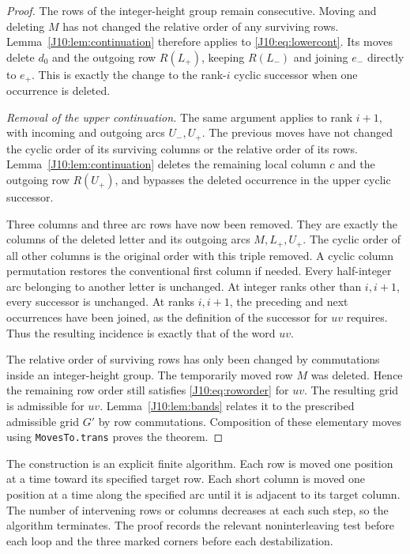 \documentclass[11pt,oneside]{report}
\theoremstyle{definition}
\numberwithin{equation}{section}
\newcommand{\decl}[1]{\textnormal{\nolinkurl{#1}}}
\begin{document}
\begin{proof}
The rows of the integer-height group remain consecutive.
Moving and deleting $M$ has not changed the relative order of any
surviving rows. Lemma~\ref{J10:lem:continuation} therefore applies to
\eqref{J10:eq:lowercont}. Its moves delete $d_0$ and the outgoing row
$R(L_+)$, keeping $R(L_-)$ and joining $e_-$ directly to $e_+$.
This is exactly the change to the rank-$i$ cyclic successor when one
occurrence is deleted.

\textit{Removal of the upper continuation.}
The same argument applies to rank $i+1$, with incoming and outgoing
arcs $U_-,U_+$. The previous moves have not changed the cyclic order
of its surviving columns or the relative order of its rows.
Lemma~\ref{J10:lem:continuation} deletes the remaining local column $c$
and the outgoing row $R(U_+)$, and bypasses the deleted occurrence
in the upper cyclic successor.

Three columns and three arc rows have now been removed. They are
exactly the columns of the deleted letter and its outgoing arcs
$M,L_+,U_+$. The cyclic order of all other columns is the original
order with this triple removed. A cyclic column permutation restores
the conventional first column if needed.
Every half-integer arc belonging to another letter is unchanged.
At integer ranks other than $i,i+1$, every successor is unchanged.
At ranks $i,i+1$, the preceding and next occurrences have been joined,
as the definition of the successor for $uv$ requires.
Thus the resulting incidence is exactly that of the word $uv$.

The relative order of surviving rows has only been changed by
commutations inside an integer-height group. The temporarily moved
row $M$ was deleted. Hence the remaining row order still satisfies
\eqref{J10:eq:roworder} for $uv$. The resulting grid is admissible for
$uv$. Lemma~\ref{J10:lem:bands} relates it to the prescribed admissible
grid $G'$ by row commutations. Composition of these elementary moves
using \decl{MovesTo.trans} proves the theorem.
\end{proof}

The construction is an explicit finite algorithm. Each row is moved
one position at a time toward its specified target row. Each short
column is moved one position at a time along the specified arc until
it is adjacent to its target column. The number of intervening rows
or columns decreases at each such step, so the algorithm terminates.
The proof records the relevant noninterleaving test before each loop
and the three marked corners before each destabilization.
\end{document}
